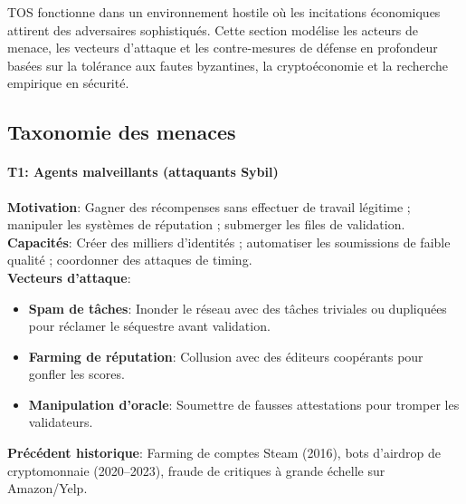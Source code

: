 \documentclass[11pt]{article}
\begin{document}
TOS fonctionne dans un environnement hostile où les incitations économiques attirent des adversaires sophistiqués. Cette section modélise les acteurs de menace, les vecteurs d'attaque et les contre-mesures de défense en profondeur basées sur la tolérance aux fautes byzantines, la cryptoéconomie et la recherche empirique en sécurité.

\subsection{Taxonomie des menaces}

\paragraph{T1: Agents malveillants (attaquants Sybil)}
\textbf{Motivation}: Gagner des récompenses sans effectuer de travail légitime ; manipuler les systèmes de réputation ; submerger les files de validation.\\
\textbf{Capacités}: Créer des milliers d'identités ; automatiser les soumissions de faible qualité ; coordonner des attaques de timing.\\
\textbf{Vecteurs d'attaque}:
\begin{itemize}[noitemsep]
  \item \textbf{Spam de tâches}: Inonder le réseau avec des tâches triviales ou dupliquées pour réclamer le séquestre avant validation.
  \item \textbf{Farming de réputation}: Collusion avec des éditeurs coopérants pour gonfler les scores.
  \item \textbf{Manipulation d'oracle}: Soumettre de fausses attestations pour tromper les validateurs.
\end{itemize}
\textbf{Précédent historique}: Farming de comptes Steam (2016), bots d'airdrop de cryptomonnaie (2020--2023), fraude de critiques à grande échelle sur Amazon/Yelp.
\end{document}
